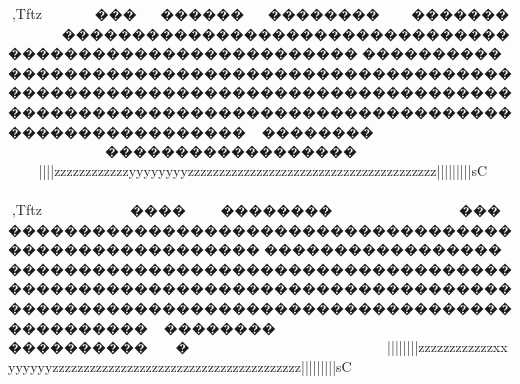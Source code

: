 {{{{{{{{{{{{{{{{{{{{{{{{{{{{{{{{{{{{{{{{{{{{{{{{{{{{{{{{{{{{{{{{{{{{{{{{{{{{{{{{{{{{{{{{{{{{{{{{{{{{{{{{{{{{{{{{{{{{{{{{{{{{{{{{{{{{{{{{{{{{{{{{{{{{{{{{{{{{{{{{{{{{{{{{{{{{{{{{{{{{{{{{{{{{{{{{{{{{{{{{{{{{{{{{{{{{{{{{{{{{{{{{{{{{{{{{{{{{{{{{{{{{{{{{{{{{{{{{{{{{{{{{{{{{{{{{{{{{{{{{{{{{{{{{{{{{{{{{{{{{{{{{{{{{{{{{{{{{{{{{{{{{{{{{{{{{{{{{{{{{{{{{{{{{{{{{{{{{{{{{{{{{{{{{{{{{{{{{{{{{{{{{{{{{{{{{{{{{{{{{{{{{{{{{{{{{{{{{{{{{{{{{{{{{{{{{{{{{{{{{{{{{{{{{{{{{{{{{{{{{{{{{{{{{{{{{{{{{{{{{{{{{{{{{{{{{{{{{{{{{{{{{{{{{{{{{{{{{{{{{{{{{{{{{{{{{{{{{{{{{{{{{{{{{{{{{{{{{{{{{{{{{{{{{{{{{{{{{{{{{{{{{{{{{{{{{{{{{{{{{{{{{{{{{{{{{{{{{{{{{{{{{{{{{{{{{{{{{{{{{{{{{{{{{{{{{{{{{{{{{{{{{{{{{{{{{{{{{{{{{{{{{{{{{{{{{{{{{{{{{{{{{{{{{{{{{{{{{{{{{{{{{{{{{{{{{{{{{{{{{{{{{{{{{{{{{{{{{{{{{{{{{{{{{{{{{{{{{{{{{{{{{{{{{{{{{{{{{{{{{{{{{{{{{{{{{{{{{{{{{{{{{{{{{{{{{{{{{{{{{{{{{{{{{{{{{{{{{{{{{{{{{{{{{{{{{{{{{{{{{{{{{{{{{{{{{{{{{{{{{{{{{{{{{{{{{{{{{{{{{{{{{{{{{{{{{{{{{{{{{{{{{{{{{{{{{{{{{{{{{{{{{{{{{{{{{{{{{{{{{{{{{{{{{{{{{{{{{{{{{{{{{{{{{{{{{{{{{{{{{{{{{{{{{{{{{{{{{{{{{{{{{{{{{{{{{{{{{{{{{{{{{{{{{{{{{{{{{{{{{{{{{{{{{{{{{{{{{{{{{{{{{{{{{{{{,Tftz~~~~~~~������������������������~}}~~~~}~��������������������������������������������������������������������������������������������������������������������������������������������������������������������������������������������������������~~~~~~~~~~~~~~~~������������������~~~~~~~~~~~~~~~~~~~~}}|}}}}}}|||{{{{{{{{{{zzzzzzzzzzzzyyyyyyyyzzzzzzzzzzzzzzzzzzzzzzzzzzzzzzzzzzzzzzzz{{{{{{{{|||||||||sC
,Tftz~~~~~~~����~��������~~~~~~~}~��������������������������������������������������������������������������������������������������������������������������������������������������������������������������������������������������������~~~~~~~~~~~~~~~~�����������~~~~~~~~~~~~~~~~~~~~~~~~~~|||||}}}}|||{{{{{{{{{{zzzzzzzzzzzzxxyyyyyyzzzzzzzzzzzzzzzzzzzzzzzzzzzzzzzzzzzzzzzz{{{{{{{{|||||||||sC
}}}}}}}}}}}}}}}}}}}}}}}}}}}}}}}}}}}}}}}}}}}}}}}}}}}}}}}}}}}}}}}}}}}}}}}}}}}}}}}}}}}}}}}}}}}}}}}}}}}}}}}}}}}}}}}}}}}}}}}}}}}}}}}}}}}}}}}}}}}}}}}}}}}}}}}}}}}}}}}}}}}}}}}}}}}}}}}}}}}}}}}}}}}}}}}}}}}}}}}}}}}}}}}}}}}}}}}}}}}}}}}}}}}}}}}}}}}}}}}}}}}}}}}}}}}}}}}}}}}}}}}}}}}}}}}}}}}}}}}}}}}}}}}}}}}}}}}}}}}}}}}}}}}}}}}}}}}}}}}}}}}}}}}}}}}}}}}}}}}}}}}}}}}}}}}}}}}}}}}}}}}}}}}}}}}}}}}}}}}}}}}}}}}}}}}}}}}}}}}}}}}}}}}}}}}}}}}}}}}}}}}}}}}}}}}}}}}}}}}}}}}}}}}}}}}}}}}}}}}}}}}}}}}}}}}}}}}}}}}}}}}}}}}}}}}}}}}}}}}}}}}}}}}}}}}}}}}}}}}}}}}}}}}}}}}}}}}}}}}}}}}}}}}}}}}}}}}}}}}}}}}}}}}}}}}}}}}}}}}}}}}}}}}}}}}}}}}}}}}}}}}}}}}}}}}}}}}}}}}}}}}}}}}}}}}}}}}}}}}}}}}}}}}}}}}}}}}}}}}}}}}}}}}}}}}}}}}}}}}}}}}}}}}}}}}}}}}}}}}}}}}}}}}}}}}}}}}}}}}}}}}}}}}}}}}}}}}}}}}}}}}}}}}}}}}}}}}}}}}}}}}}}}}}}}}}}}}}}}}}}}}}}}}}}}}}}}}}}}}}}}}}}}}}}}}}}}}}}}}}}}}}}}}}}}}}}}}}}}}}}}}}}}}}}}}}}}}}}}}}}}}}}}}}}}}}}}}}}}}}}}}}}}}}}}}}}}}}}}}}}}}}}}}}}}}}}}}}}}}}}}}}}}}}}}}}}}}}}}}}}}}}}}}}}}}}}}}}}}}}}}}}}}}}}}}}}}}}}}}}}}}}}}}}}}}}}}}}}}}}}}}}}}}}}}}}}}}}}}}}}}}}}}}}}}}}}}}}}}}}}}}}}}}}}}}}}}}}}}}}}}}}}}}}}}}}}}}}}}}}}}}}}}}}}}}}}}}}}}}}}}}}}}}}}}}}}}}}}}}}}}}}}}}}}}}
